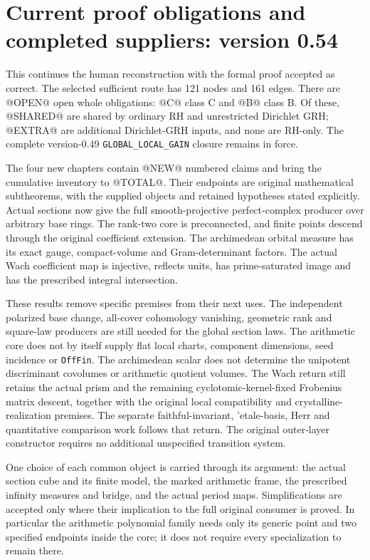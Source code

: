 \section{Current proof obligations and completed suppliers: version 0.54}
\label{sec:dependency-audit-v54}

This continues the human reconstruction with the formal proof accepted
as correct. The selected sufficient route has 121 nodes and 161 edges.
There are @OPEN@ open whole obligations: @C@ class C and @B@ class B.
Of these, @SHARED@ are shared by ordinary RH and unrestricted Dirichlet
GRH; @EXTRA@ are additional Dirichlet-GRH inputs, and none are RH-only.
The complete version-0.49 \texttt{GLOBAL\_LOCAL\_GAIN} closure remains
in force.

The four new chapters contain @NEW@ numbered claims and bring the
cumulative inventory to @TOTAL@. Their endpoints are original
mathematical subtheorems, with the supplied objects and retained
hypotheses stated explicitly. Actual sections now give the full
smooth-projective perfect-complex producer over arbitrary base rings.
The rank-two core is preconnected, and finite points descend through
the original coefficient extension. The archimedean orbital measure
has its exact gauge, compact-volume and Gram-determinant factors.
The actual Wach coefficient map is injective, reflects units, has
prime-saturated image and has the prescribed integral intersection.

These results remove specific premises from their next uses. The
independent polarized base change, all-cover cohomology vanishing,
geometric rank and square-law producers are still needed for the
global section laws. The arithmetic core does not by itself supply
flat local charts, component dimensions, seed incidence or
\texttt{OffFin}. The archimedean scalar does not determine the
unipotent discriminant covolumes or arithmetic quotient volumes.
The Wach return still retains the actual prism and the remaining
cyclotomic-kernel-fixed Frobenius matrix descent, together with the
original local compatibility and crystalline-realization premises.
The separate faithful-invariant, 'etale-basis, Herr and quantitative
comparison work follows that return. The original outer-layer
constructor requires no additional unspecified transition system.

One choice of each common object is carried through its argument:
the actual section cube and its finite model, the marked arithmetic
frame, the prescribed infinity measures and bridge, and the actual
period maps. Simplifications are accepted only where their implication
to the full original consumer is proved. In particular the arithmetic
polynomial family needs only its generic point and two specified
endpoints inside the core; it does not require every specialization
to remain there.

